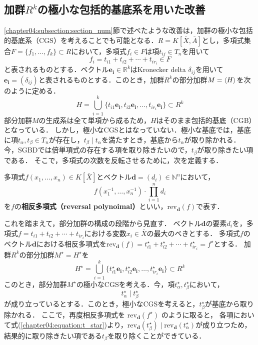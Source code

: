 \subsection{加群$R^k$の極小な包括的\groebner{}基底系を用いた改善}
\ref{chapter04:subsection:section_num}節で述べたような改善は，加群の極小な包括的\groebner{}基底系（CGS）を考えることでも可能となる．$R = K[\bar{X}, \bar{A}]$とし，多項式集合$F = \{f_1, \dots, f_k\} \subset R$において，多項式$f_i \in F$は項$t_{ij} \in T_n$を用いて
$$f_i = t_{i1} + t_{i2} + \cdots + t_{ir_i} \in F$$
と表されるものとする．ベクトル$\bm{e_i} \in \mathbb{R}^k$はKronecker delta $\delta_{ij}$を用いて$\bm{e_i} = (\delta_{ij})$と表されるものとする．このとき，加群$R^k$の部分加群$M = \langle H \rangle$を次のように定める．
$$H = \bigcup_{i=1}^k \{t_{i1}\bm{e_i}, t_{i2}\bm{e_i}, \dots, t_{ir_i}\bm{e_i}\} \subset R^k$$
部分加群$M$の生成系は全て単項から成るため，$H$はそのまま包括的\groebner{}基底（CGB）となっている．
しかし，極小なCGSとはなっていない．極小な\groebner{}基底では，基底に項$t_\alpha, t_\beta \in T_n$が存在し，$t_\beta \mid t_\alpha$を満たすとき，基底から$t_\alpha$が取り除かれる．
今，SGBDでは倍単項式の存在する項を取り除きたいので，$t_\beta$が取り除きたい項である．
そこで，多項式の次数を反転させるために，次を定義する．
\begin{definition}
	多項式$f(x_1, \dots, x_n) \in K[\bar{X}]$とベクトル$\bm{d} = (d_i) \in \mathbb{N}^n$において，
	$$f(x_1^{-1}, \dots, x_n^{-1})\cdot \prod_{i=1}^n d_i$$
	を$f$の\textbf{相反多項式（reversal polynoimal）}といい，$\mathrm{rev}_{\bm{d}}(f)$で表す．
\end{definition}
これを踏まえて，部分加群の構成の段階から見直す．
ベクトル$\bm{d}$の要素$d_i$を，多項式$f = t_{i1} + t_{i2} + \cdots + t_{ir_i}$における変数$x_i \in \bar{X}$の最大のべきとする．
多項式$f$のベクトル$\bm{d}$における相反多項式を$\mathrm{rev}_{\bm{d}}(f) = t_{i1}^{\star} + t_{i2}^{\star} + \cdots + t_{ir_i}^{\star} = f^\star$とする．
加群$R^k$の部分加群$M^\star = H^\star$を
$$H^\star = \bigcup_{i=1}^k \{t_{i1}^{\star}\bm{e_i}, t_{i2}^{\star}\bm{e_i}, \dots, t_{ir_i}^{\star}\bm{e_i}\} \subset R^k$$
このとき，部分加群$M^{\star}$の極小なCGSを考える．今，項$t_\alpha^\star, t_\beta^\star$において，
\begin{equation}
	t_\alpha^\star \mid t_\beta^\star \label{chapter04:equation:t_star}
\end{equation}
が成り立っているとする．このとき，極小なCGSを考えると，$t_\beta^{\star}$が基底から取り除かれる．
ここで，再度相反多項式を
$\mathrm{rev}_{\bm{d}}(f^\star)$
のように取ると，
各項において式(\ref{chapter04:equation:t_star})より，$\mathrm{rev}_{\bm{d}}(t_\beta^\star) \mid \mathrm{rev}_{\bm{d}}(t_\alpha^\star)$が成り立つため，結果的に取り除きたい項である$t_\beta$を取り除くことができている．







